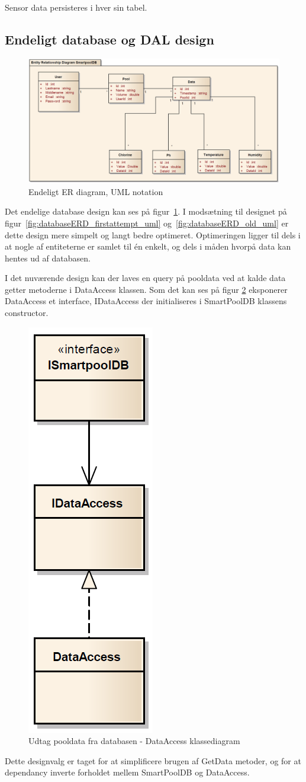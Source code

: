 Sensor data persisteres i hver sin tabel.

\subsection{Endeligt database og DAL design}

\begin{figure}[h]
	\centering
	\includegraphics[width=\linewidth]{figs/design/databaseERD_final_uml}
	\caption{Endeligt ER diagram, UML notation}
	\label{fig:databaseERD_final_uml}
\end{figure}

Det endelige database design kan ses på figur~\ref{fig:databaseERD_final_uml}. I modsætning til designet på figur~\ref{fig:databaseERD_firstattempt_uml} og~\ref{fig:databaseERD_old_uml} er dette design mere simpelt og langt bedre optimeret. Optimeringen ligger til dels i at nogle af entiteterne er samlet til én enkelt, og dels i måden hvorpå data kan hentes ud af databasen. 


I det nuværende design kan der laves en query på pooldata ved at kalde data getter metoderne i DataAccess klassen. Som det kan ses på figur \ref{fig:getDataClassDiagramPNG} eksponerer DataAccess et interface, IDataAccess der initialiseres i SmartPoolDB klassens constructor.


\begin{figure}[H]
	\centering
	\includegraphics[width=0.2\linewidth]{figs/design/dataAccessClassNoImpl.PNG}
	\caption{Udtag pooldata fra databasen - DataAccess klassediagram}
	\label{fig:getDataClassDiagramPNG}
\end{figure}

Dette designvalg er taget for at simplificere brugen af GetData metoder, og for at dependancy inverte forholdet mellem SmartPoolDB og DataAccess. 





